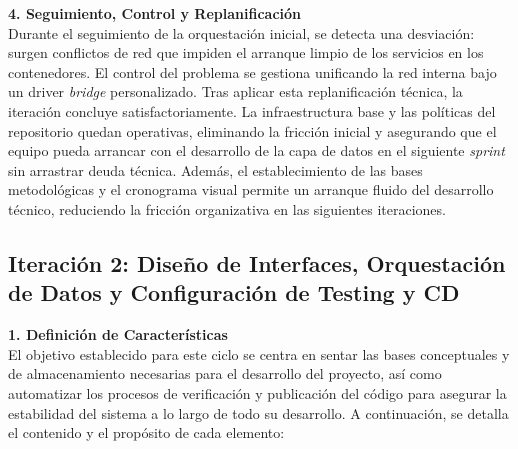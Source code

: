 \textbf{4. Seguimiento, Control y Replanificación} \\
Durante el seguimiento de la orquestación inicial, se detecta una desviación: surgen conflictos de red que impiden el arranque limpio de los servicios en los contenedores. El control del problema se gestiona unificando la red interna bajo un driver \textit{bridge} personalizado. Tras aplicar esta replanificación técnica, la iteración concluye satisfactoriamente. La infraestructura base y las políticas del repositorio quedan operativas, eliminando la fricción inicial y asegurando que el equipo pueda arrancar con el desarrollo de la capa de datos en el siguiente \textit{sprint} sin arrastrar deuda técnica.
Además, el establecimiento de las bases metodológicas y el cronograma visual permite un arranque fluido del desarrollo técnico, reduciendo la fricción organizativa en las siguientes iteraciones.

\subsection{Iteración 2: Diseño de Interfaces, Orquestación de Datos y Configuración de Testing y CD}

\textbf{1. Definición de Características} \\
El objetivo establecido para este ciclo se centra en sentar las bases conceptuales y de almacenamiento necesarias para el desarrollo del proyecto, así como automatizar los procesos de verificación y publicación del código para asegurar la estabilidad del sistema a lo largo de todo su desarrollo. A continuación, se detalla el contenido y el propósito de cada elemento:

